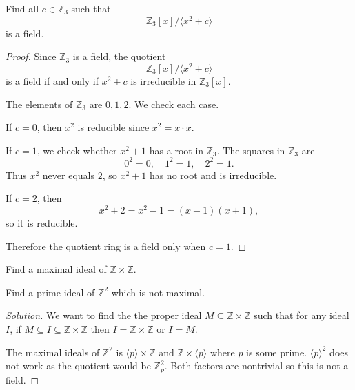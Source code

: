 \begin{prob}
    Find all $c \in \mathbb Z_3$ such that 
    \[
        \mathbb Z_3[x]/\langle x^2 + c \rangle 
    \]
    is a field.
\end{prob}
\begin{proof}
    Since $\mathbb Z_3$ is a field, the quotient
    \[
        \mathbb Z_3[x]/\langle x^2+c\rangle
    \]
    is a field if and only if $x^2+c$ is irreducible in 
    $\mathbb Z_3[x]$.

    The elements of $\mathbb Z_3$ are $0,1,2$. We check each case.

    If $c=0$, then $x^2$ is reducible since $x^2=x\cdot x$.

    If $c=1$, we check whether $x^2+1$ has a root in $\mathbb Z_3$.
    The squares in $\mathbb Z_3$ are
    \[
        0^2=0,\quad 1^2=1,\quad 2^2=1.
    \]
    Thus $x^2$ never equals $2$, so $x^2+1$ has no root and is 
    irreducible.

    If $c=2$, then
    \[
        x^2+2=x^2-1=(x-1)(x+1),
    \]
    so it is reducible.

    Therefore the quotient ring is a field only when $c=1$.
\end{proof}
\begin{prob}
    Find a maximal ideal of $\mathbb Z \times \mathbb Z$.

    Find a prime ideal of $\mathbb Z^2$ which is not maximal.
\end{prob}
\begin{proof}[Solution]
    We want to find the the proper ideal $M \subseteq \mathbb Z 
    \times \mathbb Z$ such that for any ideal $I$, 
    if $M \subseteq I \subseteq \mathbb Z \times \mathbb Z$ 
    then $I = \mathbb Z \times 
    \mathbb Z$ or $I = M$.

    The maximal ideals of $\mathbb Z^2$ is 
    $\langle p\rangle \times \mathbb Z$ and 
    $\mathbb Z \times \langle p\rangle$ where 
    $p$ is some prime. $\langle p \rangle^2$ does not work as the 
    quotient would be $\mathbb Z_p^2$. Both factors are nontrivial 
    so this is not a field. 
\end{proof}

